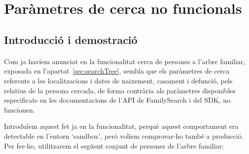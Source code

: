 \section{Paràmetres de cerca no funcionals}

\subsection{Introducció i demostració}

\paragraph{}
Com ja havíem anunciat en la funcionalitat cerca de persones a l'arbre familiar, exposada en l'apartat~\ref{sec:searchTree}, sembla que els paràmetres de cerca referents a les localitzacions i dates de naixement, casament i defunció, pels relatius de la persona cercada, de forma contrària als paràmetres disponibles especificats en les documentacions de l'API de FamilySearch i del SDK, no funcionen.

Introduíem aquest fet ja en la funcionalitat, perquè aquest comportament era detectable en l'entorn `sandbox', però volíem comprovar-ho també a producció. Per fer-ho, utilitzarem el següent conjunt de persones de l'arbre familiar:

